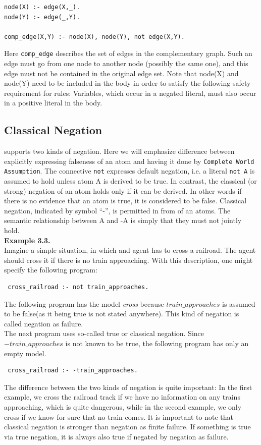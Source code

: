 \documentclass[14pt,a4paper, titlepage]{article}
\begin{document}
\begin{lstlisting}
node(X) :- edge(X,_).
node(Y) :- edge(_,Y).

comp_edge(X,Y) :- node(X), node(Y), not edge(X,Y).
\end{lstlisting}
Here \texttt{comp\_edge} describes the set of edges in the complementary graph. Such an edge must go from one node to another node (possibly the same one), and this edge must not be contained in the original edge set. Note that node(X) and node(Y) need to be included in the body in order to satisfy the following safety requirement for rules: Variables, which occur in a negated literal, must also occur in a positive literal in the body.

\subsection{Classical Negation}
\dlvhex{} supports two kinds of negation. Here we will emphasize difference between explicitly expressing falseness of an atom and having it done by \texttt{Complete World Assumption}. The connective \texttt{not} expresses default negation, i.e. a literal \texttt{not A} is assumed to hold unless atom A is derived to be true. In contrast, the classical (or strong) negation of an atom holds only if it can be derived. In other words if there is no evidence that an atom is true, it is considered to be false. Classical negation, indicated by symbol \enquote{-}, is permitted in from of an atoms. The semantic relationship between A and -A is simply that they must not jointly hold. 
\\ \textbf{Example 3.3.}
\\ Imagine a simple situation, in which and agent has to cross a railroad. The agent should cross it if there is no train approaching. With this description, one might specify the following program:
\begin{lstlisting}
 cross_railroad :- not train_approaches.
\end{lstlisting}
The following program has the model \textit{cross} because $train\_approaches$ is assumed to be false(as it being true is not stated anywhere). This kind of negation is called negation as failure.\\The next program uses so-called true or classical negation. Since \textit{$-train\_approaches$} is not known to be true, the following program has only an empty model.
\begin{lstlisting}
 cross_railroad :- -train_approaches.
\end{lstlisting}
The difference between the two kinds of negation is quite important: In the first example, we cross the railroad track if we have no information on any trains approaching, which is quite dangerous, while in the second example, we only cross if we know for sure that no train comes. It is important to note that classical negation is stronger than negation as finite failure. If something is true via true negation, it is always also true if negated by negation as failure.
\end{document}
